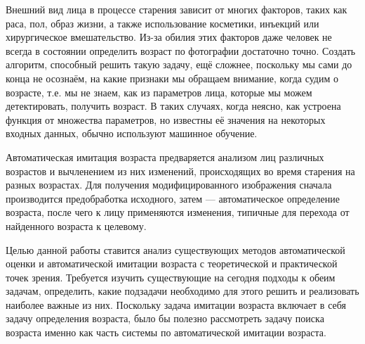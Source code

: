 Внешний вид лица в процессе старения зависит от многих факторов, таких как раса, пол, образ жизни, а также использование косметики, инъекций или хирургическое вмешательство. Из-за обилия этих факторов даже человек не всегда в состоянии определить возраст по фотографии достаточно точно. Создать алгоритм, способный решить такую задачу, ещё сложнее, поскольку мы сами до конца не осознаём, на какие признаки мы обращаем внимание, когда судим о возрасте, т.е. мы не знаем, как из параметров лица, которые мы можем детектировать, получить возраст. В таких случаях, когда неясно, как устроена функция от множества параметров, но известны её значения на некоторых входных данных, обычно используют машинное обучение.

Автоматическая имитация возраста предваряется анализом лиц различных возрастов и вычленением из них изменений, происходящих во время старения на разных возрастах. Для получения модифицированного изображения сначала производится предобработка исходного, затем --- автоматическое определение возраста, после чего к лицу применяются изменения, типичные для перехода от найденного возраста к целевому. 

Целью данной работы ставится анализ существующих методов автоматической оценки и автоматической имитации возраста с теоретической и практической точек зрения. Требуется изучить существующие на сегодня подходы к обеим задачам, определить, какие подзадачи необходимо для этого решить и реализовать наиболее важные из них. Поскольку задача имитации возраста включает в себя задачу определения возраста, было бы полезно рассмотреть задачу поиска возраста именно как часть системы по автоматической имитации возраста.